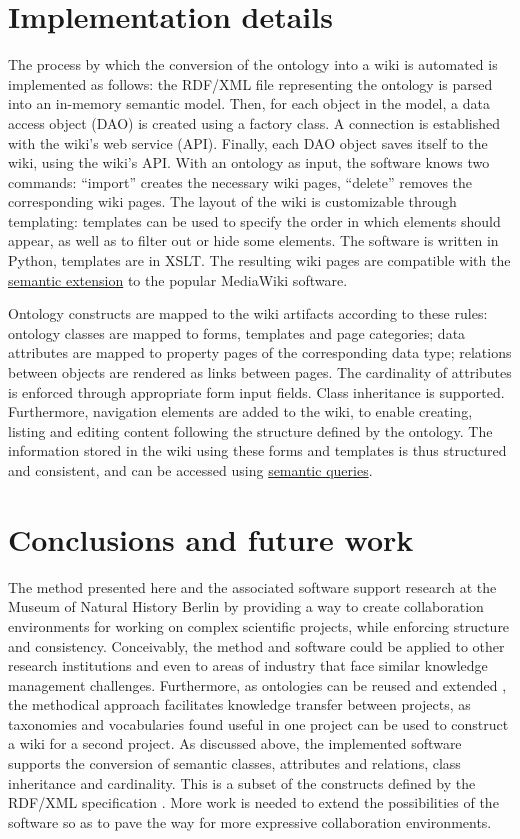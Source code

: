 \documentclass{IJCS_template}
\begin{document}
{\section{Implementation details}
The process by which the conversion of the ontology into a wiki is automated is implemented as follows: the RDF/XML file representing the ontology is parsed into an in-memory semantic model. Then, for each object in the model, a data access object (DAO) is created using a factory class. A connection is established with the wiki's web service (API). Finally, each DAO object saves itself to the wiki, using the wiki's API. With an ontology as input, the software knows two commands: ``import'' creates the necessary wiki pages, ``delete'' removes the corresponding wiki pages. The layout of the wiki is customizable through templating: templates can be used to specify the order in which elements should appear, as well as to filter out or hide some elements. The software is written in Python, templates are in XSLT. The resulting wiki pages are compatible with the \href{https://www.semantic-mediawiki.org}{semantic extension} to the popular MediaWiki software.

Ontology constructs are mapped to the wiki artifacts according to these rules: ontology classes are mapped to forms, templates and page categories; data attributes are mapped to property pages of the corresponding data type; relations between objects are rendered as links between pages. The cardinality of attributes is enforced through appropriate form input fields. Class inheritance is supported. Furthermore, navigation elements are added to the wiki, to enable creating, listing and editing content following the structure defined by the ontology. The information stored in the wiki using these forms and templates is thus structured and consistent, and can be accessed using \href{https://www.semantic-mediawiki.org}{semantic queries}.

\section{Conclusions and future work}
The method presented here and the associated software support research at the Museum of Natural History Berlin by providing a way to create collaboration environments for working on complex scientific projects, while enforcing structure and consistency. Conceivably, the method and software could be applied to other research institutions and even to areas of industry that face similar knowledge management challenges. Furthermore, as ontologies can be reused and extended \citep{noy2001ontology}, the methodical approach facilitates knowledge transfer between projects, as taxonomies and vocabularies found useful in one project can be used to construct a wiki for a second project. As discussed above, the implemented software supports the conversion of semantic classes, attributes and relations, class inheritance and cardinality. This is a subset of the constructs defined by the RDF/XML specification \citep{rdfspec}. More work is needed to extend the possibilities of the software so as to pave the way for more expressive collaboration environments.

}
\end{document}
